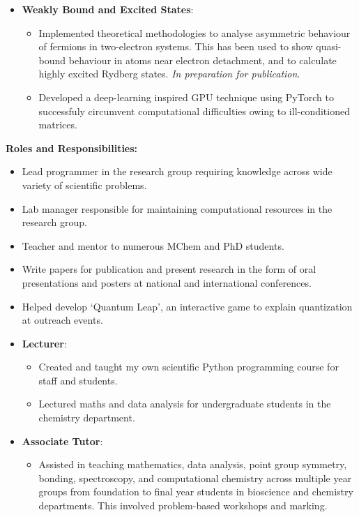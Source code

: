 {\begin{itemize}
\begin{itemize}
		\item Showed that the CS and popular LYP functional work because of inaccurate function fit conducted by CS; questioning the physical basis behind the most popular functional used in DFT. \textit{Submitted for publication in Royal Society Open Science}.
		\item Currently developing functional for weakly bound systems which DFT struggles to calculate. \textit{In preparation for publication in Physical Chemistry Chemical Physics}.
	\end{itemize}
	\item \textbf{Weakly Bound and Excited States}:
	\begin{itemize}
		\item Implemented theoretical methodologies to analyse asymmetric behaviour of fermions in two-electron systems. This has been used to show quasi-bound behaviour in atoms near electron detachment, and to calculate highly excited Rydberg states. \textit{In preparation for publication}.
		\item Developed a deep-learning inspired GPU technique using PyTorch to successfuly circumvent computational difficulties owing to ill-conditioned matrices.
	\end{itemize}
\end{itemize}

{\textbf{Roles and Responsibilities:}}
\begin{itemize}
		\item Lead programmer in the research group requiring knowledge across wide variety of scientific problems.
		\item Lab manager responsible for maintaining computational resources in the research group.
		\item Teacher and mentor to numerous MChem and PhD students. 
		\item Write papers for publication and present research in the form of oral presentations and posters at national and international conferences.
		\item Helped develop `Quantum Leap', an interactive game to explain quantization at outreach events.
		\item \textbf{Lecturer}:
		\begin{itemize}
			\item Created and taught my own scientific Python programming course for staff and students.
			\item Lectured maths and data analysis for undergraduate students in the chemistry department.
		\end{itemize}
		\item \textbf{Associate Tutor}:
		\begin{itemize}
			\item Assisted in teaching mathematics, data analysis, point group symmetry, bonding, spectroscopy, and computational chemistry across multiple year groups from foundation to final year students in bioscience and chemistry departments. This involved problem-based workshops and marking.
		\end{itemize}
\end{itemize}

}
